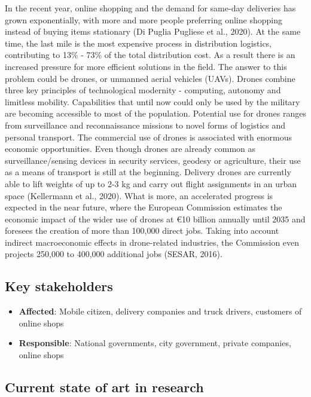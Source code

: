 \documentclass[
]{book}
\providecommand{\tightlist}{%
  \setlength{\itemsep}{0pt}\setlength{\parskip}{0pt}}
\begin{document}
In the recent year, online shopping and the demand for same-day deliveries has grown exponentially, with more and more people preferring online shopping instead of buying items stationary (Di Puglia Pugliese et al., 2020). At the same time, the last mile is the most expensive process in distribution logistics, contributing to 13\% - 73\% of the total distribution cost. As a result there is an increased pressure for more efficient solutions in the field. The answer to this problem could be drones, or unmanned aerial vehicles (UAVs). Drones combine three key principles of technological modernity - computing, autonomy and limitless mobility. Capabilities that until now could only be used by the military are becoming accessible to most of the population. Potential use for drones ranges from surveillance and reconnaissance missions to novel forms of logistics and personal transport. The commercial use of drones is associated with enormous economic opportunities. Even though drones are already common as surveillance/sensing devices in security services, geodesy or agriculture, their use as a means of transport is still at the beginning. Delivery drones are currently able to lift weights of up to 2-3 kg and carry out flight assignments in an urban space (Kellermann et al., 2020).
What is more, an accelerated progress is expected in the near future, where the European Commission estimates the economic impact of the wider use of drones at €10 billion annually until 2035 and foresees the creation of more than 100,000 direct jobs. Taking into account indirect macroeconomic effects in drone-related industries, the Commission even projects 250,000 to 400,000 additional jobs (SESAR, 2016).

\hypertarget{key-stakeholders-25}{%
\subsection*{Key stakeholders}\label{key-stakeholders-25}}

\begin{itemize}
\tightlist
\item
  \textbf{Affected}: Mobile citizen, delivery companies and truck drivers, customers of online shops
\item
  \textbf{Responsible}: National governments, city government, private companies, online shops
\end{itemize}

\hypertarget{current-state-of-art-in-research-25}{%
\subsection*{Current state of art in research}\label{current-state-of-art-in-research-25}}
\end{document}

